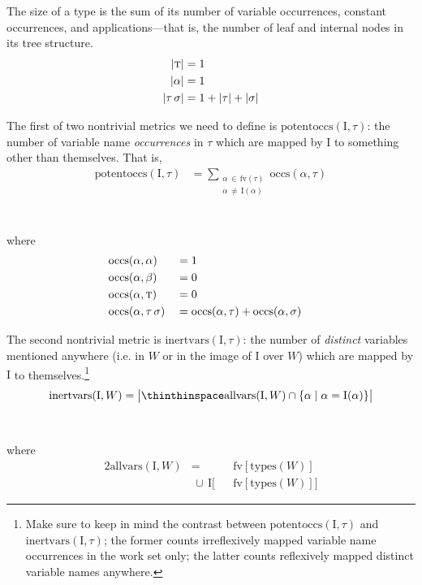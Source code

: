 \documentclass[10pt, letterpaper, oneside]{article}
\newcommand{\inertset}{\text{I}}
\newcommand{\fv}{\mathrm{fv}}
\begin{document}
The size of a type is the sum of its number of variable occurrences, constant occurrences, and applications---that is, the number of leaf and internal nodes in its tree structure.
\begin{align*}
  |\text{\sc t}| &= 1\\
  |\alpha|       &= 1\\
  |\tau\,\sigma| &= 1 + |\tau| + |\sigma|
\end{align*}

The first of two nontrivial metrics we need to define is \(\text{potentoccs}(\inertset, \tau)\): the number of variable name \emph{occurrences} in \(\tau\) which are mapped by \(\inertset\) to something other than themselves. That is,
\begin{align*}
  \text{potentoccs}(\inertset, \tau) &= \!\!\!\!\sum_{\substack{\alpha\,\in\,\fv(\tau)\\\alpha\,\ne\,\inertset(\alpha)}}\!\!\!\text{occs}(\alpha, \tau)
\end{align*}\\\vspace{-2\baselineskip}\\
where\vspace{-.5\baselineskip}
\begin{alignat*}{3}
  &\text{occs}(\alpha, \alpha) &&= 1 &&\\
  &\text{occs}(\alpha, \beta)  &&= 0 &&\\
  &\text{occs}(\alpha, \text{\sc t}) &&= 0 &&\\
  &\text{occs}(\alpha, \tau\,\sigma) &&= \text{occs}(\alpha, \tau) + \text{occs}(\alpha, \sigma) &&
\end{alignat*}

The second nontrivial metric is \(\text{inertvars}(\inertset, \tau)\): the number of \emph{distinct} variables mentioned anywhere (i.e. in \(W\) or in the image of \(\inertset\) over \(W\)) which are mapped by \(\inertset\) to themselves.\footnote{Make sure to keep in mind the contrast between \(\text{potentoccs}(\inertset, \tau)\) and \(\text{inertvars}(\inertset, \tau)\); the former counts irreflexively mapped variable name occurrences in the work set only; the latter counts reflexively mapped distinct variable names anywhere.}
\begin{align*}
  \text{inertvars}(\inertset, W) = \big|\thinthinspace\text{allvars}(\inertset, W) \cap \{\alpha \mid \alpha = \inertset(\alpha)\}\big|
\end{align*}\\\vspace{-2\baselineskip}\\
where\vspace{-.5\baselineskip}
\begin{alignat*}{2}
  \text{allvars}(\inertset, W) &= &&\fv\!\left[\text{types}(W)\right]\\
                               &\,\cup\,\inertset\big[&&\fv\!\left[\text{types}(W)\right]\!\big]
\end{alignat*}
\end{document}
